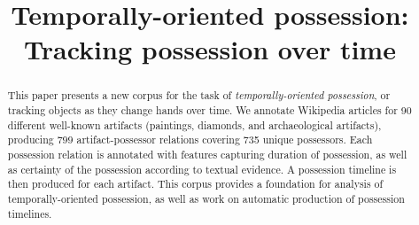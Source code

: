 \documentclass[11pt,a4paper]{article}
\title{Temporally-oriented possession: Tracking possession over time}
\date{}
\begin{document}
\maketitle
\begin{abstract}
This paper presents a new corpus for the task of \textit{temporally-oriented possession}, or tracking objects as they change hands over time. 
We annotate Wikipedia articles for 90 different well-known artifacts (paintings, diamonds, and archaeological artifacts), producing 799 artifact-possessor relations covering 735 unique possessors. 
Each possession relation is annotated with features capturing duration of possession, as well as certainty of the possession according to textual evidence.
A possession timeline is then produced for each artifact.
This corpus provides a foundation for analysis of temporally-oriented possession, as well as work on automatic production of possession timelines.
\end{abstract}









%
\end{document}
